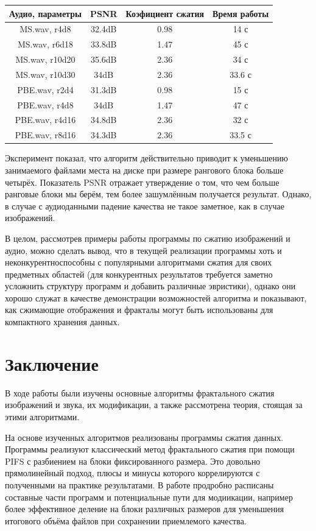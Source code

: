\documentclass[bachelor,paper]{pmk-graduate}
\theoremstyle{definition}
\begin{document}
\begin{center}
\begin{tabular}{|c|c|c|c|}
  \hline
  Аудио, параметры & PSNR & Коэфициент сжатия & Время работы\\\hline
  MS.wav, r4d8   & 32.4dB & 0.98 & 14 с\\
  MS.wav, r6d18  & 33.8dB & 1.47 & 45 с \\
  MS.wav, r10d20 & 35.6dB & 2.36 & 34 с \\
  MS.wav, r10d30 & 34dB   & 2.36 & 33.6 с \\
  PBE.wav, r2d4  & 31.3dB & 0.98 & 15 с \\
  PBE.wav, r4d8  & 34dB   & 1.47 & 47 с \\
  PBE.wav, r4d16 & 34.8dB & 2.36 & 32 с \\
  PBE.wav, r8d16 & 34.3dB & 2.36 & 33.5 с \\\hline
\end{tabular}
\end{center}

Эксперимент показал, что алгоритм действительно приводит к уменьшению занимаемого файлами места на диске при размере рангового блока больше четырёх. Показатель PSNR отражает утверждение о том, что чем больше ранговые блоки мы берём, тем более зашумлённым получается результат. Однако, в случае с аудиоданными падение качества не такое заметное, как в случае изображений.

В целом, рассмотрев примеры работы программы по сжатию изображений и аудио, можно сделать вывод, что в текущей реализации программы хоть и неконкурентноспособны с популярными алгоритмами сжатия для своих предметных областей (для конкурентных результатов требуется заметно усложнить структуру программ и добавить различные эвристики), однако они хорошо служат в качестве демонстрации возможностей алгоритма и показывают, как сжимающие отображения и фракталы могут быть использованы для компактного хранения данных.

{}
\chapter*{Заключение}

В ходе работы были изучены основные алгоритмы фрактального сжатия изображений и звука, их модификации, а также рассмотрена теория, стоящая за этими алгоритмами.

На основе изученных алгоритмов реализованы программы сжатия данных. Программы реализуют классический метод фрактального сжатия при помощи PIFS с разбиением на блоки фиксированного размера. Это довольно прямолинейный подход, плюсы и минусы которого коррелируются с полученными на практике результатами. В работе продробно расписаны составные части программ и потенциальные пути для модиикации, например более эффективное деление на блоки различных размеров для уменьшения итогового объёма файлов при сохранении приемлемого качества.
\end{document}
